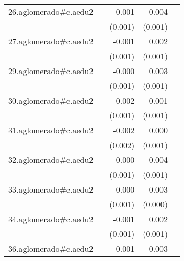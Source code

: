{\begin{longtable}{l*{4}{D{.}{.}{-1}}}
\addlinespace
26.aglomerado#c.aedu2&                     &       0.001         &       0.004\sym{***}&                     \\
            &                     &     (0.001)         &     (0.001)         &                     \\
\addlinespace
27.aglomerado#c.aedu2&                     &      -0.001         &       0.002\sym{**} &                     \\
            &                     &     (0.001)         &     (0.001)         &                     \\
\addlinespace
29.aglomerado#c.aedu2&                     &      -0.000         &       0.003\sym{***}&                     \\
            &                     &     (0.001)         &     (0.001)         &                     \\
\addlinespace
30.aglomerado#c.aedu2&                     &      -0.002         &       0.001         &                     \\
            &                     &     (0.001)         &     (0.001)         &                     \\
\addlinespace
31.aglomerado#c.aedu2&                     &      -0.002         &       0.000         &                     \\
            &                     &     (0.002)         &     (0.001)         &                     \\
\addlinespace
32.aglomerado#c.aedu2&                     &       0.000         &       0.004\sym{***}&                     \\
            &                     &     (0.001)         &     (0.001)         &                     \\
\addlinespace
33.aglomerado#c.aedu2&                     &      -0.000         &       0.003\sym{***}&                     \\
            &                     &     (0.001)         &     (0.000)         &                     \\
\addlinespace
34.aglomerado#c.aedu2&                     &      -0.001         &       0.002         &                     \\
            &                     &     (0.001)         &     (0.001)         &                     \\
\addlinespace
36.aglomerado#c.aedu2&                     &      -0.001         &       0.003\sym{***}&                     \\

\end{longtable}}
